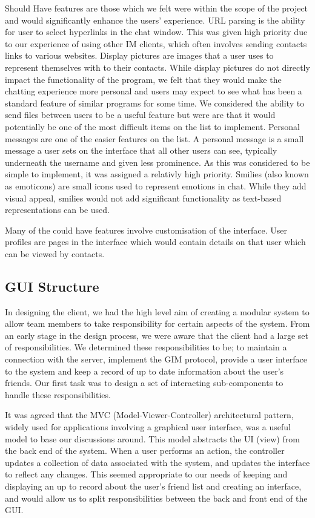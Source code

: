 Should Have features are those which we felt were within the scope of the project and would significantly enhance the users' experience. URL parsing is the ability for user to select hyperlinks in the chat window. This was given high priority due to our experience of using other IM clients, which often involves sending contacts links to various websites. Display pictures are images that a user uses to represent themselves with to their contacts. While display pictures do not directly impact the functionality of the program, we felt that they would make the chatting experience more personal and users may expect to see what has been a standard feature of similar programs for some time. We considered the ability to send files between users to be a useful feature but were are that it would potentially be one of the most difficult items on the list to implement. Personal messages are one of the easier features on the list. A personal message is a small message a user sets on the interface that all other users can see, typically underneath the username and given less prominence. As this was considered to be simple to implement, it was assigned a relativly high priority. Smilies (also known as emoticons) are small icons used to represent emotions in chat. While they add visual appeal, smilies would not add significant functionality as text-based representations can be used.

Many of the could have features involve customisation of the interface. User profiles are pages in the interface which would contain details on that user which can be viewed by contacts. 

\subsection{GUI Structure}
In designing the client, we had the high level aim of creating a modular system to allow team members to take responsibility for certain aspects of the system. From an early stage in the design process, we were aware that the client had a large set of responsibilities. We determined these responsibilities to be;  to maintain a connection with the server, implement the GIM protocol, provide a user interface to the system and keep a record of up to date information about the user’s friends. Our first task was to design a set of interacting sub-components to handle these responsibilities.

It was agreed that the MVC (Model-Viewer-Controller) architectural pattern, widely used for applications involving a graphical user interface, was a useful model to base our discussions around. This model abstracts the UI (view) from the back end of the system. When a user performs an action, the controller updates a collection of data associated with the system, and updates the interface to reflect any changes. This seemed appropriate to our needs of keeping and displaying an up to record about the user’s friend list and creating an interface, and would allow us to split responsibilities between the back and front end of the GUI. 

